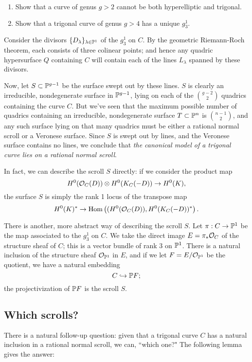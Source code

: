 \begin{exercise}
\begin{enumerate}
\item Show that a curve of genus $g > 2$ cannot be both hyperelliptic and trigonal.
\item Show that a trigonal curve of genus $g > 4$ has a unique $g^1_3$.
\end{enumerate}
\end{exercise}

Consider the divisors $\{D_\lambda\}_{\lambda \in \PP^1}$ of the $g^1_3$ on $C$. By the geometric Riemann-Roch theorem, each consists of three colinear points; and hence any quadric hypersurface $Q$ containing $C$ will contain each of the lines $L_\lambda$ spanned by these divisors. 

Now, let $S \subset \PP^{g-1}$ be the surface swept out by these lines. $S$ is clearly an irreducible, nondegenerate surface in $\PP^{g-1}$, lying on each of the $\binom{g-2}{2}$ quadrics containing the curve $C$. But we've seen that the maximum possible number of quadrics containing an irreducible, nondegenerate surface $T \subset \PP^n$ is $\binom{n-1}{2}$, and any such surface lying on that many quadrics must be either a rational normal scroll or a Veronese surface. Since $S$ is swept out by lines, and the Veronese surface contains no lines, we conclude that \emph{the canonical model of a trigonal curve lies on a rational normal scroll}.

In fact, we can describe the scroll $S$ directly: if we consider the product map
$$
H^0(\cO_C(D)) \otimes H^0(K_C(-D)) \to H^0(K),
$$
the surface $S$ is simply the rank 1 locus of the transpose map
$$
H^0(K)^* \to \Hom\left((H^0(\cO_C(D)), H^0(K_C(-D))^*\right).
$$

There is another, more abstract way of describing the scroll $S$. Let $\pi : C \to \PP^1$ be the map associated to the $g^1_3$ on $C$. We take the direct image $E = \pi_*\cO_C$ of the structure sheaf of $C$; this is a vector bundle of rank 3 on $\PP^1$. There is a natural inclusion of the structure sheaf $\cO_{\PP^1}$ in $E$, and if we let $F = E/\cO_{\PP^1}$ be the quotient, we have a natural embedding 
$$
C \hookrightarrow \PP F;
$$
the projectivization of $\PP F$ is the scroll $S$.

 \subsection{Which scrolls?}

There is a natural follow-up question: given that a trigonal curve $C$ has a natural inclusion in a rational normal scroll, we can, ``which one?" The following lemma gives the answer:

